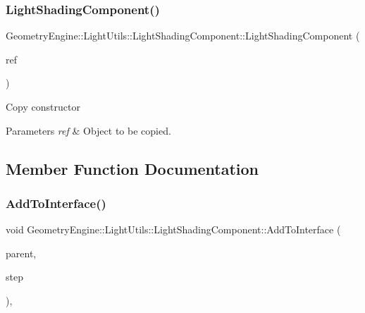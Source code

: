 \subsubsection{\texorpdfstring{LightShadingComponent()}{LightShadingComponent()}\hspace{0.1cm}{\footnotesize\ttfamily [2/2]}}
{\footnotesize\ttfamily Geometry\+Engine\+::\+Light\+Utils\+::\+Light\+Shading\+Component\+::\+Light\+Shading\+Component (\begin{DoxyParamCaption}\item[{const \mbox{\hyperlink{class_geometry_engine_1_1_light_utils_1_1_light_shading_component}{Light\+Shading\+Component}} \&}]{ref }\end{DoxyParamCaption})\hspace{0.3cm}{\ttfamily [inline]}}

Copy constructor 
\begin{DoxyParams}{Parameters}
{\em ref} & Object to be copied. \\
\hline
\end{DoxyParams}


\subsection{Member Function Documentation}
\mbox{\label{class_geometry_engine_1_1_light_utils_1_1_light_shading_component_a249c8d383bab7232cc0ad425c9249709}} 
\subsubsection{\texorpdfstring{AddToInterface()}{AddToInterface()}}
{\footnotesize\ttfamily void Geometry\+Engine\+::\+Light\+Utils\+::\+Light\+Shading\+Component\+::\+Add\+To\+Interface (\begin{DoxyParamCaption}\item[{\mbox{\hyperlink{class_geometry_engine_1_1_light_utils_1_1_light_component_manager}{Light\+Component\+Manager}} $\ast$}]{parent,  }\item[{\mbox{\hyperlink{namespace_geometry_engine_1_1_light_utils_a16eb370137c2fd151e6f8e1d07cd23e0}{Light\+Shading}}}]{step }\end{DoxyParamCaption})\hspace{0.3cm}{\ttfamily [protected]}, {\ttfamily [virtual]}}

